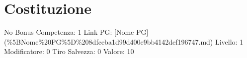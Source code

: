 \section{Costituzione}\label{costituzione}

\begin{description}
\tightlist
\item[Tags: STAT]
No Bonus Competenza: 1 Link PG: {[}Nome PG{]}
(\%5BNome\%20PG\%5D\%208dfceba1d99d400e9bb4142def196747.md) Livello: 1
Modificatore: 0 Tiro Salvezza: 0 Valore: 10
\end{description}
